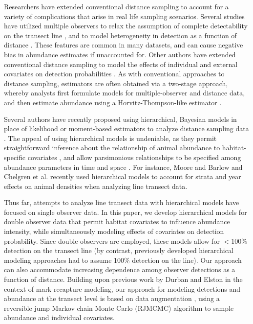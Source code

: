\documentclass[10pt]{article}
\begin{document}
Researchers have extended conventional distance sampling to account for a variety of complications that arise in real life sampling scenarios.  Several studies have utilized multiple observers to relax the assumption of complete detectability on the transect line \cite{BorchersEtAl1998}, and to model heterogeneity in detection as a function of distance \cite{LaakeBorchers2004,BorchersEtAl2006,BucklandEtAl2010}.  These features are common in many datasets, and can cause negative bias in abundance estimates if unaccounted for.  Other authors have extended conventional distance sampling to model the effects of individual and external covariates on detection probabilities \cite{DrummerMcdonald1987,RamseyEtAl1987,MarquesBuckland2003}.  As with conventional approaches to distance sampling, estimators are often obtained via a two-stage approach, whereby analysts first formulate models for multiple-observer and distance data, and then estimate abundance using a Horvitz-Thompson-like estimator \cite{Huggins1989,Alho1990}.

Several authors have recently proposed using hierarchical, Bayesian models in place of likelihood or moment-based estimators to analyze distance sampling data \cite{RoyleDorazio2008,LinkBarker2010,RoyleDorazio2010,MooreBarlow2011,ChelgrenEtAl2011,SchmidtEtAl2012}. The appeal of using hierarchical models is undeniable, as they permit straightforward inference about the relationship of animal abundance to habitat-specific covariates \cite{RoyleEtAl2004}, and allow parsimonious relationships to be specified among abundance parameters in time and space \cite{RoyleEtAl2007}.
For instance, Moore and Barlow \cite{MooreBarlow2011} and Chelgren et al. \cite{ChelgrenEtAl2011} recently used hierarchical models to account for strata and year effects on animal densities when analyzing line transect data.

Thus far, attempts to analyze line transect data with hierarchical models have focused on single observer data.  In this paper, we develop hierarchical models for double observer data that permit habitat covariates to influence abundance intensity, while simultaneously modeling effects of covariates on detection probability.  Since double observers are employed, these models allow for $<$100\% detection on the transect line (by contrast, previously developed hierarchical modeling approaches had to assume 100\% detection on the line).  Our approach can also accommodate increasing dependence among observer detections as a function of distance.  Building upon previous work by Durban and Elston \cite{DurbanElston2005} in the context of mark-recapture modeling, our approach for modeling detections and abundance at the transect level is based on data augmentation \cite{TannerWong1987,RoyleEtAl2007b}, using a reversible jump Markov chain Monte Carlo (RJMCMC) algorithm \cite{CarlinChib1995,Green1995} to sample abundance and individual covariates.
\end{document}
